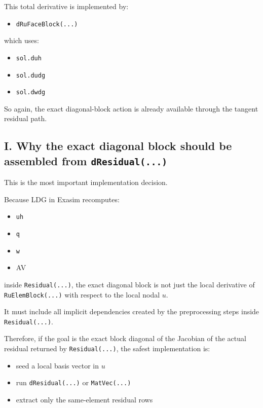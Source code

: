 \documentclass[11pt]{article}
\begin{document}
This total derivative is implemented by:

\begin{itemize}[leftmargin=*]
\item \texttt{dRuFaceBlock(...)}
\end{itemize}

which uses:

\begin{itemize}[leftmargin=*]
\item \texttt{sol.duh}
\item \texttt{sol.dudg}
\item \texttt{sol.dwdg}
\end{itemize}

So again, the exact diagonal-block action is already available through the
tangent residual path.

\subsection*{I. Why the exact diagonal block should be assembled from \texttt{dResidual(...)}}

This is the most important implementation decision.

Because LDG in Exasim recomputes:

\begin{itemize}[leftmargin=*]
\item \texttt{uh}
\item \texttt{q}
\item \texttt{w}
\item AV
\end{itemize}

inside \texttt{Residual(...)}, the exact diagonal block is not just the local
derivative of \texttt{RuElemBlock(...)} with respect to the local nodal $u$.

It must include all implicit dependencies created by the preprocessing steps
inside \texttt{Residual(...)}.

Therefore, if the goal is the exact block diagonal of the Jacobian of the
actual residual returned by \texttt{Residual(...)}, the safest implementation
is:

\begin{itemize}[leftmargin=*]
\item seed a local basis vector in $u$
\item run \texttt{dResidual(...)} or \texttt{MatVec(...)}
\item extract only the same-element residual rows
\end{itemize}
\end{document}
